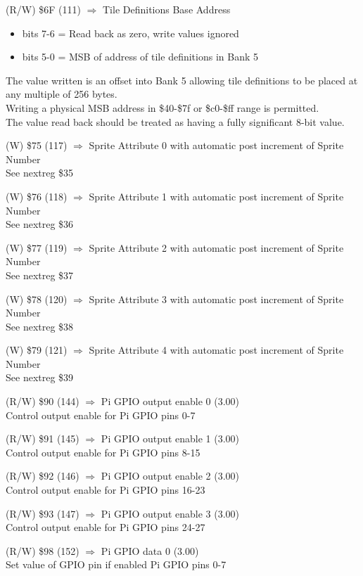 (R/W) \$6F (111) $\Rightarrow$ Tile Definitions Base Address
\begin{itemize}
\item[] bits 7-6 = Read back as zero, write values ignored
\item[] bits 5-0 = MSB of address of tile definitions in Bank 5
\end{itemize}
The value written is an offset into Bank 5 allowing tile definitions
to be placed at any multiple of 256 bytes.\\
Writing a physical MSB address in \$40-\$7f or \$c0-\$ff range is
permitted.\\
The value read back should be treated as having a fully significant
8-bit value.

(W) \$75 (117) $\Rightarrow$ Sprite Attribute 0 with automatic post
increment of Sprite Number\\
See nextreg \$35

(W) \$76 (118) $\Rightarrow$ Sprite Attribute 1 with automatic post
increment of Sprite Number\\
See nextreg \$36

(W) \$77 (119) $\Rightarrow$ Sprite Attribute 2 with automatic post
increment of Sprite Number\\
See nextreg \$37

(W) \$78 (120) $\Rightarrow$ Sprite Attribute 3 with automatic post
increment of Sprite Number\\
See nextreg \$38

(W) \$79 (121) $\Rightarrow$ Sprite Attribute 4 with automatic post
increment of Sprite Number\\
See nextreg \$39

(R/W) \$90 (144) $\Rightarrow$ Pi GPIO output enable 0 (3.00)\\
Control output enable for Pi GPIO pins 0-7

(R/W) \$91 (145) $\Rightarrow$ Pi GPIO output enable 1 (3.00)\\
Control output enable for Pi GPIO pins 8-15

(R/W) \$92 (146) $\Rightarrow$ Pi GPIO output enable 2 (3.00)\\
Control output enable for Pi GPIO pins 16-23

(R/W) \$93 (147) $\Rightarrow$ Pi GPIO output enable 3 (3.00)\\
Control output enable for Pi GPIO pins 24-27

(R/W) \$98 (152) $\Rightarrow$ Pi GPIO data 0 (3.00)\\
Set value of GPIO pin if enabled Pi GPIO pins 0-7

